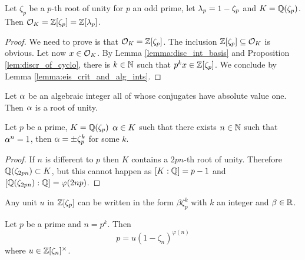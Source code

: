 \begin{theorem}\label{theorem:ring_of_ints_of_cyclo}
	\leanok 
	Let $\zeta_p$ be a $p$-th root of unity for $p$ an odd prime, let $\lambda_p=1-\zeta_p$ and $K=\mathbb{Q}(\zeta_p)$. Then $\mathcal{O}_K=\mathbb{Z}[\zeta_p]=\mathbb{Z}[\lambda_p]$.
\end{theorem}
\begin{proof}
    \leanok
    We need to prove is that $\mathcal{O}_K=\mathbb{Z}[\zeta_p]$. The inclusion $\mathbb{Z}[\zeta_p] \subseteq \mathcal{O}_K$ is obvious. Let now $x \in \mathcal{O}_K$. By Lemma \ref{lemma:disc_int_basis} and Proposition \ref{lem:discr_of_cyclo}, there is $k \in \mathbb{N}$ such that $p^k x \in \mathbb{Z}[\zeta_p]$. We conclude by Lemma \ref{lemma:eis_crit_and_alg_ints}.
\end{proof}

\begin{lemma}\label{lemma:alg_int_abs_val_one}
    \leanok
	Let $\alpha$ be an algebraic integer all of whose conjugates have absolute value one. Then $\alpha$ is a root of unity.
\end{lemma}

\begin{lemma}\label{lem:roots_of_unity_in_cyclo}
	\leanok
	Let $p$ be a prime, $K=\mathbb{Q}(\zeta_p)$ $\alpha \in K$ such that there exists $n \in \mathbb{N}$ such that $\alpha^n=1$, then $\alpha =\pm \zeta_p^k$ for some $k$.
\end{lemma}
\begin{proof}
	If $n$ is different to $p$ then $K$ contains a $2pn$-th root of unity. Therefore $\mathbb{Q}(\zeta_{2pn}) \subset K$, but this cannot happen as $[K : \mathbb{Q}]=p-1$ and $[\mathbb{Q}(\zeta_{2pn}): \mathbb{Q} ] = \varphi(2np)$.
\end{proof}

\begin{lemma}\label{lemma:unit_lemma}
	\leanok
	Any unit $u$ in $\mathbb{Z}[\zeta_p]$ can be written in the form $\beta \zeta_p^k  $ with $k$ an integer and $\beta \in \mathbb{R}$.
\end{lemma}

\begin{lemma}\label{lemma:fac_of_p_in_p_th_root}
	Let $p$ be a prime and $n=p^k$. Then \[p=u(1-\zeta_n)^{\varphi(n)}\] where $u \in \mathbb{Z}[\zeta_n]^{\times}$.
\end{lemma}

